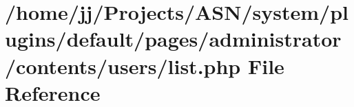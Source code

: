 \hypertarget{system_2plugins_2default_2pages_2administrator_2contents_2users_2list_8php}{}\section{/home/jj/\+Projects/\+A\+S\+N/system/plugins/default/pages/administrator/contents/users/list.php File Reference}
\label{system_2plugins_2default_2pages_2administrator_2contents_2users_2list_8php}
